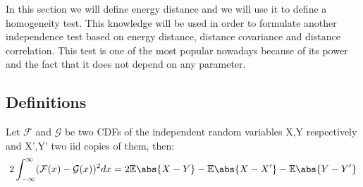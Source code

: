 
In this section we will define energy distance and we will use it to define a homogeneity test.
This knowledge will be used in order to formulate another independence test based on energy distance, distance covariance and distance correlation. This test is one of the most popular nowadays because of its power and the fact that it does not depend on any parameter.

\subsection{Definitions}

\begin{prop}
Let $\mathcal{F}$ and $\mathcal{G}$ be two CDFs of the independent random variables X,Y respectively and  X',Y' two iid copies of them, then:
$$
2\int_{-\infty}^{\infty}(\mathcal{F}(x) - \mathcal{G}(x))^{2} dx = 2\mathbb{E}\abs{X-Y} - \mathbb{E}\abs{X-X'} -\mathbb{E}\abs{Y-Y'}  
$$
\end{prop}
